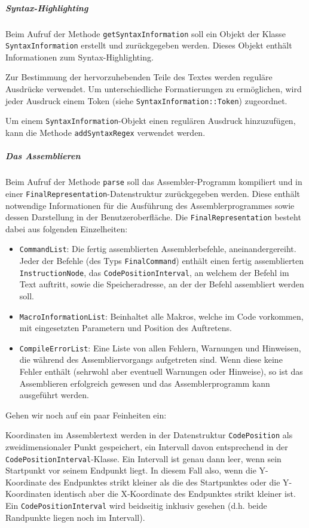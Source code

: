 \subparagraph{Syntax-Highlighting}

Beim Aufruf der Methode \texttt{getSyntaxInformation} soll ein Objekt der Klasse
\texttt{SyntaxInformation} erstellt und zurückgegeben werden. Dieses Objekt
enthält Informationen zum Syntax-Highlighting.

Zur Bestimmung der hervorzuhebenden Teile des Textes werden reguläre Ausdrücke
verwendet. Um unterschiedliche Formatierungen zu ermöglichen, wird jeder
Ausdruck einem Token (siehe \texttt{SyntaxInformation::Token}) zugeordnet.

Um einem \texttt{SyntaxInformation}-Objekt einen regulären Ausdruck
hinzuzufügen, kann die Methode \texttt{addSyntaxRegex} verwendet werden.

\subparagraph{Das Assemblieren}

Beim Aufruf der Methode \texttt{parse} soll das Assembler-Programm kompiliert
und in einer \texttt{FinalRepresentation}-Datenstruktur zurückgegeben werden.
Diese enthält notwendige Informationen für die Ausführung des
Assemblerprogrammes sowie dessen Darstellung in der Benutzeroberfläche. Die
\texttt{FinalRepresentation} besteht dabei aus folgenden Einzelheiten:

\begin{itemize} \item \texttt{CommandList}: Die fertig assemblierten
Assemblerbefehle, aneinandergereiht. Jeder der Befehle (des Typs
\texttt{FinalCommand}) enthält einen fertig assemblierten
\texttt{InstructionNode}, das \texttt{CodePositionInterval}, an welchem der
Befehl im Text auftritt, sowie die Speicheradresse, an der der Befehl
assembliert werden soll. \item \texttt{MacroInformationList}: Beinhaltet alle
Makros, welche im Code vorkommen, mit eingesetzten Parametern und Position des
Auftretens. \item \texttt{CompileErrorList}: Eine Liste von allen Fehlern,
Warnungen und Hinweisen, die während des Assembliervorgangs aufgetreten sind.
Wenn diese keine Fehler enthält (sehrwohl aber eventuell Warnungen oder
Hinweise), so ist das Assemblieren erfolgreich gewesen und das Assemblerprogramm
kann ausgeführt werden. \end{itemize}

Gehen wir noch auf ein paar Feinheiten ein:

Koordinaten im Assemblertext werden in der Datenstruktur \texttt{CodePosition}
als zweidimensionaler Punkt gespeichert, ein Intervall davon entsprechend in der
\texttt{CodePositionInterval}-Klasse. Ein Intervall ist genau dann leer, wenn
sein Startpunkt vor seinem Endpunkt liegt. In diesem Fall also, wenn die
Y-Koordinate des Endpunktes strikt kleiner als die des Startpunktes oder die
Y-Koordinaten identisch aber die X-Koordinate des Endpunktes strikt kleiner ist.
Ein \texttt{CodePositionInterval} wird beidseitig inklusiv gesehen (d.h. beide
Randpunkte liegen noch im Intervall).

